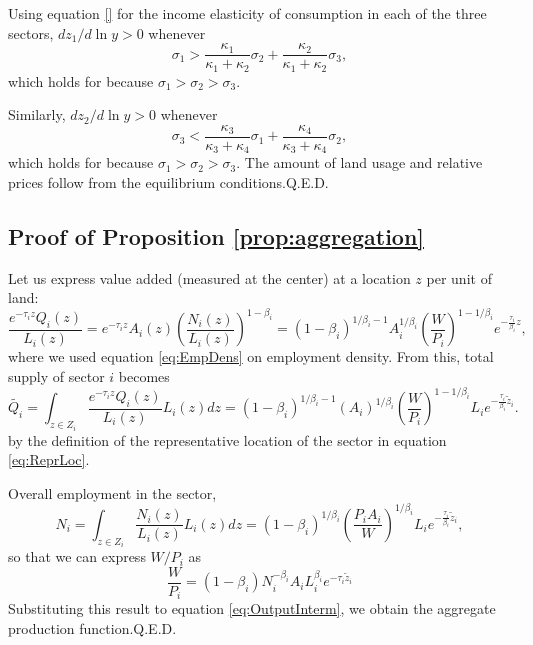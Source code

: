 \documentclass[12pt]{article}
\begin{document}
Using equation \eqref{} for the income elasticity of consumption in each of the three sectors, $dz_1/d\ln y>0$ whenever 
\[
\sigma_1> \frac{\kappa_1}{\kappa_1+\kappa_2}\sigma_2 + \frac{\kappa_2}{\kappa_1+\kappa_2}\sigma_3, 
\]
which holds for because $\sigma_1>\sigma_2>\sigma_3$.

Similarly, $dz_2/d\ln y>0$ whenever 
\[
\sigma_3 < \frac{\kappa_3}{\kappa_3+\kappa_4}\sigma_1 + \frac{\kappa_4}{\kappa_3+\kappa_4}\sigma_2, 
\]
which holds for because $\sigma_1>\sigma_2>\sigma_3$. The amount of land usage and relative prices follow from the equilibrium conditions.\hfill Q.E.D.
\subsection{Proof of Proposition \ref{prop:aggregation}}
Let us express value added (measured at the center) at a location $z$ per unit of land:
\[
\frac{e^{-\tau_i z} Q_i(z)}{L_i(z)} = e^{-\tau_i z} A_i(z)\left(\frac{N_i(z)}{L_i(z)}\right)^{1-\beta_i} = (1-\beta_i)^{1/\beta_i-1}
A_i^{1/\beta_i}\left(\frac{W}{P_i}\right)^{1-1/\beta_i}
 e^{-\frac{\tau_i}{\beta_i} z},
\]
where we used equation \ref{eq:EmpDens} on employment density. From this, total supply of sector $i$ becomes
\begin{equation}
\label{eq:OutputInterm}
\tilde{Q_i} = \int_{z\in Z_i}\frac{e^{-\tau_i z} Q_i(z)}{L_i(z)}L_i(z)dz=(1-\beta_i)^{1/\beta_i-1}
(A_i)^{1/\beta_i}\left(\frac{W}{P_i}\right)^{1-1/\beta_i} L_i e^{-\frac{\tau_i}{\beta_i} \tilde z_i}.
\end{equation}
by the definition of the representative location of the sector in equation \ref{eq:ReprLoc}.

Overall employment in the sector,
\[
N_i = \int_{z\in Z_i}\frac{N_i(z)}{L_i(z)}L_i(z)dz= (1-\beta_i)^{1/\beta_i}
\left(\frac{P_iA_i}{W}\right)^{1/\beta_i} L_i e^{-\frac{\tau_i}{\beta_i} \tilde z_i},
\]
so that we can express $W/P_i$ as
\[
\frac{W}{P_i} = (1-\beta_i)
N_i^{-\beta_i}A_i L_i^{\beta_i}
 e^{-\tau_i\tilde z_i}
\]
Substituting this result to equation \eqref{eq:OutputInterm}, we obtain the aggregate production function.\hfill Q.E.D.
\end{document}
